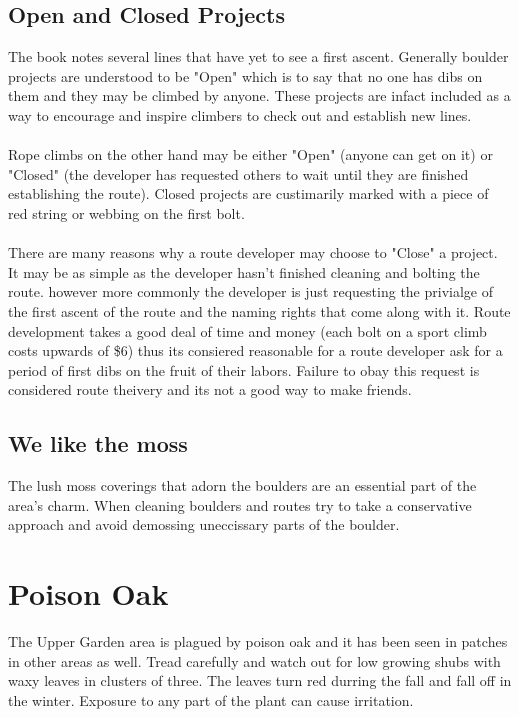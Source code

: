 \subsection*{Open and Closed Projects}
The book notes several lines that have yet to see a first ascent. Generally boulder projects are understood to be "Open" which is to say that no one has dibs on them and they may be climbed by anyone. These projects are infact included as a way to encourage and inspire climbers to check out and establish new lines.\\
\\
Rope climbs on the other hand may be either "Open" (anyone can get on it) or "Closed" (the developer has requested others to wait until they are finished establishing the route). Closed projects are custimarily marked with a piece of red string or webbing on the first bolt.\\
\\
There are many reasons why a route developer may choose to "Close" a project. It may be as simple as the developer hasn't finished cleaning and bolting the route. however more commonly the developer is just requesting the privialge of the first ascent of the route and the naming rights that come along with it. Route development takes a good deal of time and money (each bolt on a sport climb costs upwards of \$6) thus its consiered reasonable for a route developer ask for a period of first dibs on the fruit of their labors. Failure to obay this request is considered route theivery and its not a good way to make friends.\\
\subsection*{We like the moss}
The lush moss coverings that adorn the boulders are an essential part of the area's charm. When cleaning boulders and routes try to take a conservative approach and avoid demossing uneccissary parts of the boulder.
\section{Poison Oak}
The Upper Garden area is plagued by poison oak and it has been seen in patches in other areas as well. Tread carefully and watch out for low growing shubs with waxy leaves in clusters of three. The leaves turn red durring the fall and fall off in the winter. Exposure to any part of the plant can cause irritation.\\

